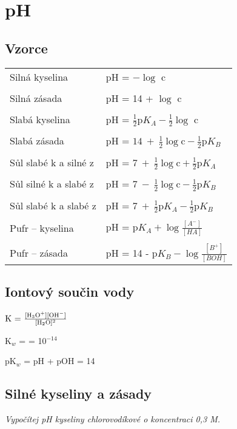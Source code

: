 \section{pH}

\subsection{Vzorce}

\begin{tabular}{ll}
	Silná kyselina & pH = $-\log$ c \\
	& \\
	Silná zásada & pH = 14 + $\log$ c \\
	& \\
	Slabá kyselina & pH = $\frac{1}{2}\textrm{p}K_A-\frac{1}{2}\log$ c \\
	& \\
	Slabá zásada & pH = $14\ +\ \frac{1}{2}\log\textrm{c} - \frac{1}{2}\textrm{p}K_B$ \\
	& \\
	Sůl slabé k a silné z & pH = $7\ +\ \frac{1}{2}\log\textrm{c} + \frac{1}{2}\textrm{p}K_A$ \\
	& \\
	Sůl silné k a slabé z & pH = $7\ -\ \frac{1}{2}\log\textrm{c} - \frac{1}{2}\textrm{p}K_B$ \\
	& \\
	Sůl slabé k a slabé z & pH = $7\ +\ \frac{1}{2}\textrm{p}K_A - \frac{1}{2}\textrm{p}K_B$ \\
	& \\
	Pufr -- kyselina & pH = $\textrm{p}K_A + \log \frac{[A^-]}{[HA]}$ \\
	& \\
	Pufr -- zásada & pH = 14 - $\textrm{p}K_B - \log \frac{[B^+]}{[BOH]}$ \\
\end{tabular}

\subsection{Iontový součin vody}

$\textrm{K = }\frac{[\ce{H3O+}][\ce{OH-}]}{[\ce{H2O}]^2}$

K$_w$ = \ce{[H3O+][OH-]} = 10$^{-14}$

pK$_w$ = pH + pOH = 14

\pagebreak

\subsection{Silné kyseliny a zásady}
\textit{Vypočítej pH kyseliny chlorovodíkové o koncentraci 0,3 M.}

